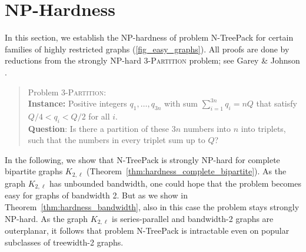 \documentclass[runningheads]{llncs}
\newcommand{\xxxNTP}{{\sc N-TreePack}}
\newcommand{\lasse}[1]{#1}
\begin{document}
\section{NP-Hardness}
\label{sec:hardness}
In this section, we establish the NP-hardness of problem {\xxxNTP} for certain families of
highly restricted graphs (\cref{fig_easy_graphs}). 
All proofs are done by reductions from the strongly NP-hard \textsc{3-Partition} problem;
see Garey \& Johnson \cite{garey1979computers}. 
\begin{quote}
Problem \textsc{3-Partition}: 
\\
\textbf{Instance:} Positive integers $q_1,\ldots,q_{3n}$ with sum $\sum_{i=1}^{3n}q_i=nQ$ that satisfy 
$Q/4<q_i<Q/2$ for all $i$.
\\
\textbf{Question}: Is there a partition of these $3n$ numbers into $n$ into triplets, such that \lasse{the numbers in} 
every triplet sum up to $Q$?  
\end{quote}
In the following, we show that {\xxxNTP} is strongly NP-hard for \lasse{complete bipartite graphs $K_{2,\ell}$} (Theorem~\ref{thm:hardness_complete_bipartite}). \lasse{As the graph $K_{2,\ell}$ has unbounded bandwidth, one could hope that the problem becomes easy for graphs of bandwidth 2. But as we show in Theorem~\ref{thm:hardness_bandwidth}, also in this case the problem stays strongly NP-hard. As the graph $K_{2,\ell}$ is series-parallel and bandwidth-2 graphs are outerplanar, it follows that problem {\xxxNTP} is intractable even on popular subclasses of treewidth-2 graphs. }
\end{document}
